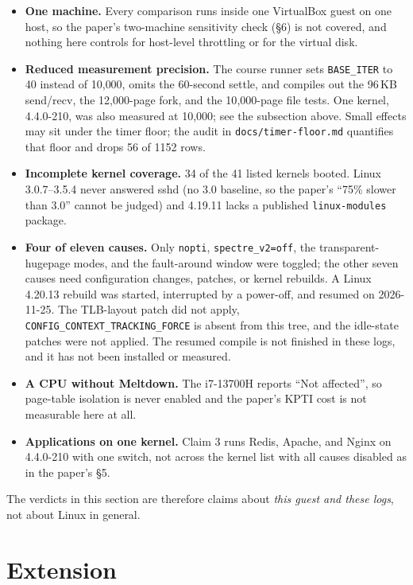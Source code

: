 \documentclass[11pt]{article}
\begin{document}
\begin{itemize}
\item \textbf{One machine.} Every comparison runs inside one VirtualBox guest on one host, so the paper's two-machine sensitivity check (\S6) is not covered, and nothing here controls for host-level throttling or for the virtual disk.
\item \textbf{Reduced measurement precision.} The course runner sets \texttt{BASE\_ITER} to 40 instead of 10{,}000, omits the 60-second settle, and compiles out the 96\,KB send/recv, the 12{,}000-page fork, and the 10{,}000-page file tests. One kernel, 4.4.0-210, was also measured at 10{,}000; see the subsection above. Small effects may sit under the timer floor; the audit in \texttt{docs/timer-floor.md} quantifies that floor and drops 56 of 1152 rows.
\item \textbf{Incomplete kernel coverage.} 34 of the 41 listed kernels booted. Linux 3.0.7--3.5.4 never answered sshd (no 3.0 baseline, so the paper's ``75\% slower than 3.0'' cannot be judged) and 4.19.11 lacks a published \texttt{linux-modules} package.
\item \textbf{Four of eleven causes.} Only \texttt{nopti}, \texttt{spectre\_v2=off}, the transparent-hugepage modes, and the fault-around window were toggled; the other seven causes need configuration changes, patches, or kernel rebuilds. A Linux 4.20.13 rebuild was started, interrupted by a power-off, and resumed on 2026-11-25. The TLB-layout patch did not apply, \texttt{CONFIG\_CONTEXT\_TRACKING\_FORCE} is absent from this tree, and the idle-state patches were not applied. The resumed compile is not finished in these logs, and it has not been installed or measured.
\item \textbf{A CPU without Meltdown.} The i7-13700H reports ``Not affected'', so page-table isolation is never enabled and the paper's KPTI cost is not measurable here at all.
\item \textbf{Applications on one kernel.} Claim 3 runs Redis, Apache, and Nginx on 4.4.0-210 with one switch, not across the kernel list with all causes disabled as in the paper's \S5.
\end{itemize}

The verdicts in this section are therefore claims about \emph{this guest and these logs}, not about Linux in general.

\section{Extension}
\label{sec:batch}
\end{document}
